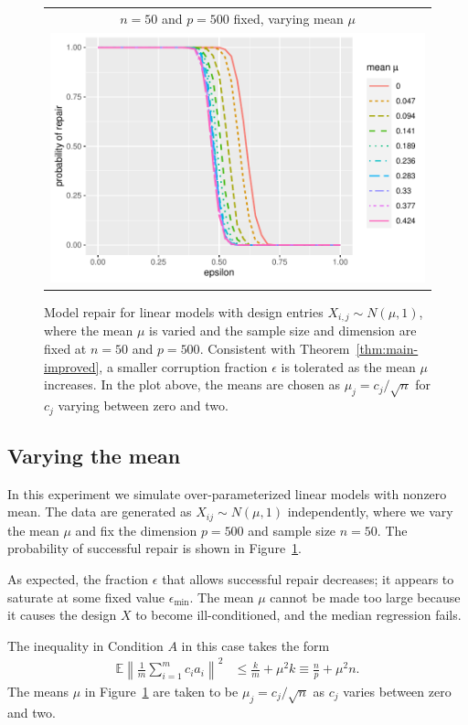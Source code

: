 \begin{figure}[ht]
  \begin{center}
    \begin{tabular}{c}
      $n=50$ and $p=500$ fixed, varying mean $\mu$\\
      \includegraphics[width=.55\textwidth]{figures/fig5}
    \end{tabular}
  \end{center}
\caption{Model repair for linear models with design entries $X_{i,j}\sim N(\mu, 1)$,
where the mean $\mu$ is varied and the sample size and dimension are fixed at $n=50$ and $p=500$. Consistent with Theorem~\ref{thm:main-improved}, a smaller corruption fraction $\epsilon$ is tolerated as the mean $\mu$ increases. In the plot above, the means are chosen as $\mu_j = c_j/\sqrt{n}$ for $c_j$ varying between zero and two.}
\label{fig:mean}
\end{figure}

\subsection{Varying the mean}


In this experiment we simulate over-parameterized linear models
with nonzero mean. The data are generated as $X_{ij} \sim N(\mu,1)$
independently, where we vary the mean $\mu$ and fix the dimension $p=500$ and sample size $n=50$.
The probability of successful repair is shown in Figure~\ref{fig:mean}.


As expected, the fraction $\epsilon$ that allows successful repair decreases; it appears to saturate at some fixed value $\epsilon_{\min}$. The mean $\mu$ cannot be made too large because it causes the design $X$ to become ill-conditioned, and the median regression fails.

The inequality in Condition $A$ in this case takes the form
\begin{align*}
  \mathbb{E}\left\|\frac{1}{m}\sum_{i=1}^m c_i a_i\right\|^2 &\leq \frac{k}{m} + \mu^2 k
   \equiv \frac{n}{p} + \mu^2 n.
\end{align*}
The means $\mu$ in Figure~\ref{fig:mean} are taken to be $\mu_j = c_j / \sqrt{n}$ as $c_j$ varies between zero and two.

